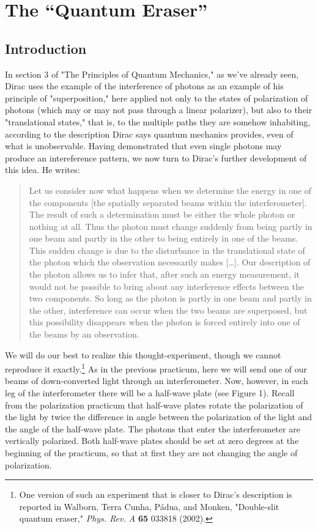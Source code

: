 \chapter{The ``Quantum Eraser''}



\section*{Introduction}

In section 3 of "The Principles of Quantum Mechanics," as we've already seen, Dirac uses the example of the interference of photons as an example of his principle of "superposition," here applied not only to the states of polarization of photons (which may or may not pass through a linear polarizer), but also to their "translational states," that is, to the multiple paths they are somehow inhabiting, according to the description Dirac says quantum mechanics provides, even of what is unobservable. Having demonstrated that even single photons may produce an intereference pattern, we now turn to Dirac's further development of this idea. He writes:
\begin{quote}
Let us consider now what happens when we determine the energy in one of the components [the spatially separated beams within the interferometer]. The result of such a determination must be either the whole photon or nothing at all. Thus the photon must change suddenly from being partly in one beam and partly in the other to being entirely in one of the beams. This sudden change is due to the disturbance in the translational state of the photon which the observation necessarily makes [\ldots ]. Our description of the photon allows us to infer that, after such an energy measurement, it would not be possible to bring about any interference effects between the two components. So long as the photon is partly in one beam and partly in the other, interference can occur when the two beams are superposed, but this possibility disappears when the photon is forced entirely into one of the beams by an observation. 
\end{quote}
We will do our best to realize this thought-experiment, though we cannot reproduce it exactly.\footnote{One version of such an experiment that is closer to Dirac's description is reported in Walborn, Terra Cunha, Pádua, and Monken, "Double-slit quantum eraser," \emph{Phys. Rev. A} \textbf{65} 033818 (2002).} As in the previous practicum, here we will send one of our beams of down-converted light through an interferometer.  Now, however, in each leg of the interferometer there will be a half-wave plate (see Figure 1).  Recall from the polarization practicum that half-wave plates rotate the polarization of the light by twice the difference in angle between the polarization of the light and the angle of the half-wave plate. The photons that enter the interferometer are vertically polarized.  Both half-wave plates should be set at zero degrees at the beginning of the practicum, so that at first they are not changing the angle of polarization.

